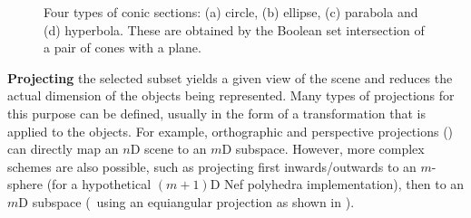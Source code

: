 \begin{figure}[tb]
\centering
{}
\caption[Conic sections]{Four types of conic sections: (a) circle, (b) ellipse, (c) parabola and (d) hyperbola.
These are obtained by the Boolean set intersection of a pair of cones with a plane.}
\label{fig:conic}
\end{figure}

\textbf{Projecting} the selected subset yields a given view of the scene and reduces the actual dimension of the objects being represented.
Many types of projections for this purpose can be defined, usually in the form of a transformation that is applied to the objects.
For example, orthographic and perspective projections () can directly map an $n$D scene to an $m$D subspace.
However, more complex schemes are also possible, such as projecting first inwards/outwards to an $m$-sphere (for a hypothetical $(m+1)$D Nef polyhedra implementation), then to an $m$D subspace (\eg\ using an equiangular projection as shown in ).

